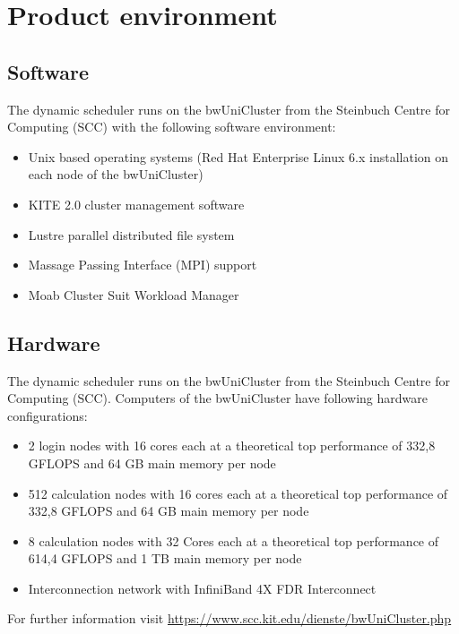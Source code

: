 \section{Product environment}
	\subsection{Software}
	The dynamic scheduler runs on the bwUniCluster from the Steinbuch Centre for Computing (SCC) with the following software environment:
	\begin{itemize}
		\item Unix based operating systems (Red Hat Enterprise Linux 6.x installation on each node of the bwUniCluster)
		\item KITE 2.0 cluster management software
		\item Lustre parallel distributed file system
		\item Massage Passing Interface (MPI) support
		\item Moab Cluster Suit Workload Manager
	\end{itemize}
	\subsection{Hardware}
	The dynamic scheduler runs on the bwUniCluster from the Steinbuch Centre for Computing (SCC). Computers of the bwUniCluster have following hardware configurations:
		\begin{itemize}
			\item 2 login nodes with 16 cores each at a theoretical top performance of 332,8 GFLOPS and 64 GB main memory per node 
			\item 512 calculation nodes with 16 cores each at a theoretical top performance of 332,8 GFLOPS and 64 GB main memory per node
			\item 8 calculation nodes with 32 Cores each at a theoretical top performance of 614,4 GFLOPS and 1 TB main memory per node
			\item Interconnection network with InfiniBand 4X FDR Interconnect
		\end{itemize}
		For further information visit \href{https://www.scc.kit.edu/dienste/bwUniCluster.php}{https://www.scc.kit.edu/dienste/bwUniCluster.php}
    
 